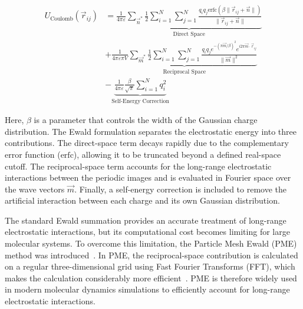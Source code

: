 \begin{equation}\label{eq:ewald_total}
\begin{aligned}
    U_{\text{Coulomb}}(\vec{r}_{ij}) &= \underbrace{ \frac{1}{4\pi\varepsilon} \sum_{\vec{n}^*} \frac{1}{2} \sum_{i=1}^{N} \sum_{j=1}^{N} \frac{q_i q_j \text{erfc}(\beta\|\vec{r}_{ij} + \vec{n}\|)}{\|\vec{r}_{ij} + \vec{n}\|} }_{\text{Direct Space}} \\
    &+ \underbrace{ \frac{1}{4\pi\varepsilon \pi V} \sum_{\vec{m}^*} \frac{1}{2} \sum_{i=1}^{N} \sum_{j=1}^{N} \frac{q_i q_j e^{-(\pi\vec{m}/\beta)^2} e^{i 2\pi\vec{m}\cdot\vec{r}_{ij}}}{\|\vec{m}\|^2} }_{\text{Reciprocal Space}} \\
    & - \underbrace{ \frac{1}{4\pi\varepsilon} \frac{\beta}{\sqrt{\pi}} \sum_{i=1}^{N} q_i^2 }_{\text{Self-Energy Correction}}
\end{aligned}
\end{equation}

Here, $\beta$ is a parameter that controls the width of the Gaussian charge distribution. The Ewald formulation separates the electrostatic energy into three contributions. The direct-space term decays rapidly due to the complementary error function ($\text{erfc}$), allowing it to be truncated beyond a defined real-space cutoff. The reciprocal-space term accounts for the long-range electrostatic interactions between the periodic images and is evaluated in Fourier space over the wave vectors $\vec{m}$. Finally, a self-energy correction is included to remove the artificial interaction between each charge and its own Gaussian distribution.


The standard Ewald summation provides an accurate treatment of long-range electrostatic interactions, but its computational cost becomes limiting for large molecular systems. To overcome this limitation, the Particle Mesh Ewald (PME) method was introduced~\cite{Frenkel2023,Darden1993,pme}. In PME, the reciprocal-space contribution is calculated on a regular three-dimensional grid using Fast Fourier Transforms (FFT), which makes the calculation considerably more efficient~\cite{pme}. PME is therefore widely used in modern molecular dynamics simulations to efficiently account for long-range electrostatic interactions.



